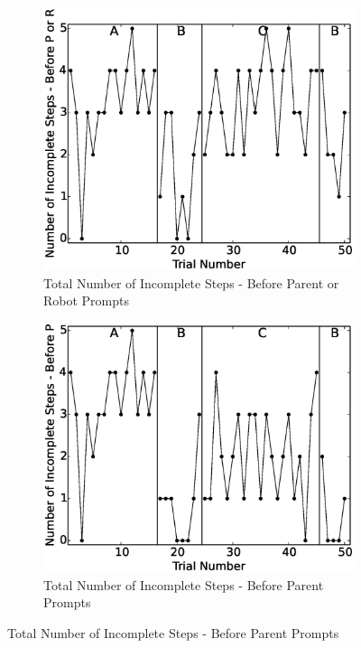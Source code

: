 \begin{figure}[h]
	\centering
	\begin{subfigure}[b]{0.49\textwidth}
		\includegraphics[width=1.1\linewidth]{./img/data_analysis/7NumberofIncompleteSteps-BeforePorR.eps}
		\caption{Total Number of Incomplete Steps - Before Parent or Robot Prompts}
		\label{fig:7TotalNumberofIncompleteSteps-BeforeParentorRobotPrompts}
	\end{subfigure}
	\hfill
	\begin{subfigure}[b]{0.49\textwidth}
		\includegraphics[width=1.1\linewidth]{./img/data_analysis/6NumberofIncompleteSteps-BeforeP.eps}
		\caption{Total Number of Incomplete Steps - Before Parent Prompts}
		\label{fig:6TotalNumberofIncompleteSteps-BeforeParentPrompts}
	\end{subfigure}%
	

\end{figure}
